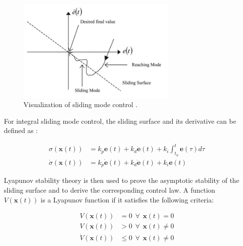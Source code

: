 \documentclass[12pt]{article}
\begin{document}
\begin{center}
\begin{figure}[H]
\captionsetup{width=.8\textwidth}
\centering
\includegraphics[width=0.70\textwidth]{SMC_visualization.PNG}
\caption{\label{fig:SMC_visualization}Visualization of sliding mode control \cite{camacho}.}
\end{figure}
\end{center}

For integral sliding mode control, the sliding surface and its derivative can be defined as \cite{SMCControlObservation}:

\begin{center}
\begin{equation} \label{eq:s_definition}
\begin{split}
\sigma(\bm x(t)) &= k_p\bm e(t) + k_d\dot{\bm e}(t) + k_i\int_{t_0}^t\bm e(\tau)d\tau\\
\dot{\sigma}(\bm x(t)) &= k_p\dot{\bm e}(t) + k_d\ddot{\bm e}(t) + k_i\bm e(t)
\end{split}
\end{equation}
\end{center}

Lyapunov stability theory is then used to prove the asymptotic stability of the sliding surface and to derive the corresponding control law. A function $V(\bm x(t))$ is a Lyapunov function if it satisfies the following criteria:

\begin{centering}
\begin{equation} \label{eq:lyapunov}
\begin{split}
V(\bm x(t)) &= 0 \ \ \forall \ \ \bm x(t) = 0 \\
V(\bm x(t)) &> 0 \ \ \forall \ \ \bm x(t) \neq 0 \\
\dot{V}(\bm x(t)) &\leq 0 \ \ \forall \ \ \bm x(t) \neq 0
\end{split}
\end{equation}
\end{centering}
\end{document}
